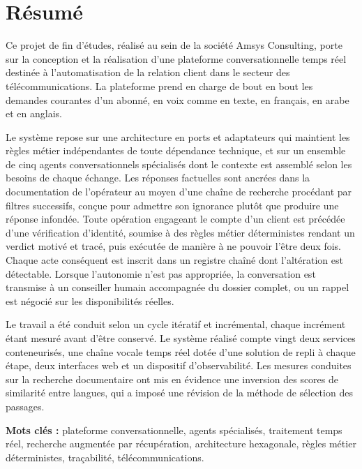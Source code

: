 \chapter*{Résumé}
\thispagestyle{empty}

Ce projet de fin d'études, réalisé au sein de la société Amsys Consulting, porte sur la conception et la réalisation d'une plateforme conversationnelle temps réel destinée à l'automatisation de la relation client dans le secteur des télécommunications. La plateforme prend en charge de bout en bout les demandes courantes d'un abonné, en voix comme en texte, en français, en arabe et en anglais.

Le système repose sur une architecture en ports et adaptateurs qui maintient les règles métier indépendantes de toute dépendance technique, et sur un ensemble de cinq agents conversationnels spécialisés dont le contexte est assemblé selon les besoins de chaque échange. Les réponses factuelles sont ancrées dans la documentation de l'opérateur au moyen d'une chaîne de recherche procédant par filtres successifs, conçue pour admettre son ignorance plutôt que produire une réponse infondée. Toute opération engageant le compte d'un client est précédée d'une vérification d'identité, soumise à des règles métier déterministes rendant un verdict motivé et tracé, puis exécutée de manière à ne pouvoir l'être deux fois. Chaque acte conséquent est inscrit dans un registre chaîné dont l'altération est détectable. Lorsque l'autonomie n'est pas appropriée, la conversation est transmise à un conseiller humain accompagnée du dossier complet, ou un rappel est négocié sur les disponibilités réelles.

Le travail a été conduit selon un cycle itératif et incrémental, chaque incrément étant mesuré avant d'être conservé. Le système réalisé compte vingt deux services conteneurisés, une chaîne vocale temps réel dotée d'une solution de repli à chaque étape, deux interfaces web et un dispositif d'observabilité. Les mesures conduites sur la recherche documentaire ont mis en évidence une inversion des scores de similarité entre langues, qui a imposé une révision de la méthode de sélection des passages.

\bigskip
\noindent\textbf{Mots clés :} plateforme conversationnelle, agents spécialisés, traitement temps réel, recherche augmentée par récupération, architecture hexagonale, règles métier déterministes, traçabilité, télécommunications.

